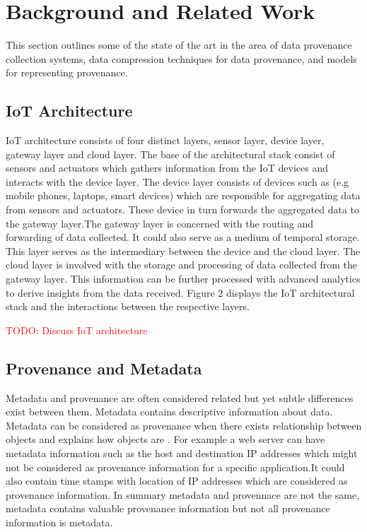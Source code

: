 


\chapter{Background and Related Work}\label{background}

This section outlines some of the state of the art in the area of data provenance collection systems, data compression techniques for data provenance, and models for representing provenance.

\section{IoT Architecture}

IoT architecture consists of four distinct layers, sensor layer, device layer, gateway layer and cloud layer. The base of the architectural stack consist of sensors and actuators which gathers information from the IoT devices and interacts with the device layer. The device layer consists of devices such as (e.g mobile phones, laptops, smart devices) which are responsible for aggregating data from sensors and actuators. These device in turn forwards the aggregated data to the gateway layer.The gateway layer is concerned with the routing and forwarding of data collected. It could also serve as a medium of temporal storage. This layer serves as the intermediary between the device and the cloud layer. The cloud layer is involved with the storage and processing of data collected from the gateway layer. This information can be further processed with advanced analytics to derive insights from the data received.  Figure 2 displays the IoT architectural stack and the interactions between the respective  layers.






\textcolor{red}{TODO: Discuss IoT architecture}



\section{Provenance and Metadata}
Metadata and provenance are often considered related but yet subtle differences exist between them. Metadata contains descriptive information about data. Metadata can be considered as provenance when there exists relationship between objects and explains how objects are . For example a web server can have metadata information such as the host and destination IP addresses which might not be considered as provenance information for a specific application.It could also contain time stamps with location of IP addresses which are considered as provenance information. In summary metadata and provennace are not the same, metadata contains valuable  provenance information but not all provenance information is metadata. 



